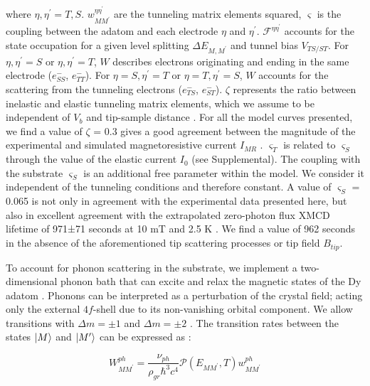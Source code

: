 \documentclass[
reprint,amsmath,amssymb,aps]{revtex4-2}
\begin{document}
where $\eta,\eta^{\prime}=T,S$. $w_{MM^{\prime}}^{\eta \eta^{\prime}} $ are the tunneling matrix elements squared, $\varsigma$ is the coupling between the adatom and each electrode $\eta$ and $\eta^{\prime}$. $\mathcal{F}^{\eta\eta^{\prime}}$ accounts for the state occupation for a given level splitting $\Delta E_{M,M^{\prime}}$ and tunnel bias $V_{TS/ST}$. For $\eta,\eta^{\prime}=S$ or $\eta,\eta^{\prime}=T$, $W$ describes electrons originating and ending in the same electrode ($e^{-}_{SS}$, $e^{-}_{TT}$). For $\eta = S,\eta^{\prime}=T$ or $\eta = T,\eta^{\prime}=S$, $W$ accounts for the scattering from the tunneling electrons ($e^{-}_{TS}$, $e^{-}_{ST}$). $\zeta$ represents the ratio between inelastic and elastic tunneling matrix elements, which we assume to be independent of $V_b$ and tip-sample distance \cite{fern2009,paul_ControlMillisecondSpin_2017,lorenteEfficientSpinTransitions2009,nussinovNoiseSpectroscopySingle2003}. For all the model curves presented, we find a value of $\zeta$ = 0.3 gives a good agreement between the magnitude of the experimental and simulated magnetoresistive current $I_{MR}$ \cite{delgadoSpinTransferTorqueSingle2010,delgado2010}.
$\varsigma_T$ is related to $\varsigma_S$ through the value of the elastic current $I_0$ (see Supplemental). The coupling with the substrate $\varsigma_S$ is an additional free parameter within the model. We consider it independent of the tunneling conditions and therefore constant. A value of $\varsigma_S$ = 0.065 is not only in agreement with the experimental data presented here, but also in excellent agreement with the extrapolated zero-photon flux XMCD lifetime of 971±71 seconds at 10 mT and 2.5 K \citep{baltic2016}. We find a value of 962 seconds in the absence of the aforementioned tip scattering processes or tip field $B_{tip}$. 

To account for phonon scattering in the substrate, we implement a two-dimensional phonon bath that can excite and relax the magnetic states of the Dy adatom \cite{cervetti2016,politi_tunneling_1995}. Phonons can be interpreted as a perturbation of the crystal field; acting only the external $4f$-shell due to its non-vanishing orbital component. We allow transitions with $\Delta m = \pm 1$ and $\Delta m = \pm 2$ \citep{cervetti2016}. The transition rates between the states $\ket{M}$ and $\ket{M^{\prime}}$ can be expressed as \cite{politi_tunneling_1995, cervetti2016,Leuenberger2000}:

\begin{equation}
    \label{eq:phonon_rates}
    W_{MM^{\prime}}^{ph}=\dfrac{\nu_{ph}}{\rho_{gr} \hbar^3 c^4} \mathcal{P} \left( E_{MM^{\prime}}, T \right) w^{ph}_{MM^{\prime}}
\end{equation}
\end{document}
